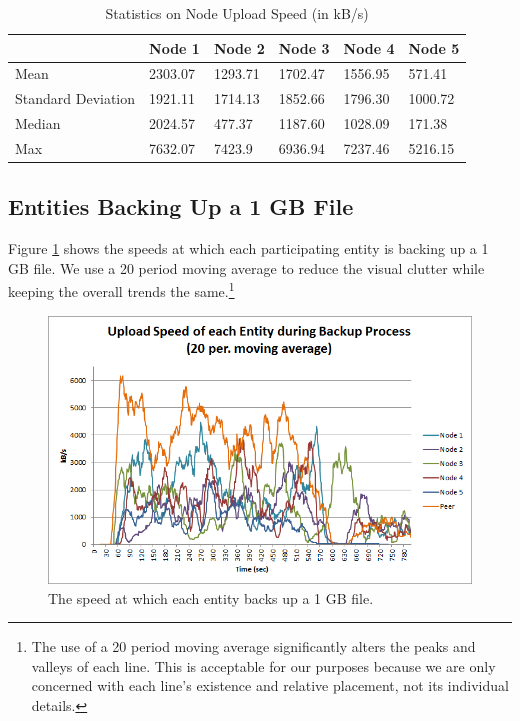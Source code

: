 \documentclass[12pt]{report}
\begin{document}
\begin{table}
\begin{center}
    \begin{tabular}{| l | l | l | l | l | l |}
    \hline
    & Node 1 & Node 2 & Node 3 & Node 4 & Node 5 \\ \hline
    Mean & 2303.07 & 1293.71 & 1702.47 & 1556.95 & 571.41 \\ \hline
    Standard Deviation & 1921.11 & 1714.13 & 1852.66 & 1796.30 & 1000.72 \\ \hline
    Median & 2024.57 & 477.37 & 1187.60 & 1028.09 & 171.38 \\ \hline
    Max & 7632.07 & 7423.9 & 6936.94 & 7237.46 & 5216.15 \\ \hline
    \end{tabular}
    \caption{Statistics on Node Upload Speed (in kB/s)}
    \label{tab:NodeRecoverySpeed}
\end{center}
\end{table}

\subsection{Entities Backing Up a 1 GB File} \label{subsec:EntitiesBackingUpa1GBFile}

Figure \ref{fig:EntityBackupSpeed} shows the speeds at which each participating entity is backing up a 1 GB file.  We use a 20 period moving average to reduce the visual clutter while keeping the overall trends the same.\footnote{The use of a 20 period moving average significantly alters the peaks and valleys of each line. This is acceptable for our purposes because we are only concerned with each line's existence and relative placement, not its individual details.}

\begin{figure}
  \centerline{\includegraphics[scale=1]{figures/EntityBackupSpeed}}
  \caption{The speed at which each entity backs up a 1 GB file. \label{fig:EntityBackupSpeed}}
\end{figure}
\end{document}

